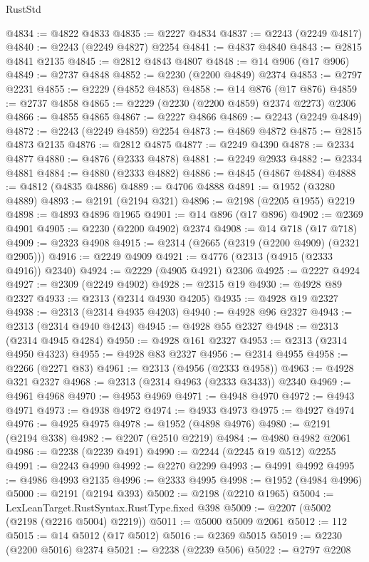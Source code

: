 \begin{lexlean}{RustStd}
\begin{coremodule}
{\begin{coremodule}
{{{{{{{{{{{{{{{{{{{{{{{{{{{{{{{{{{@4834 := @4822 @4833
@4835 := @2227 @4834
@4837 := @2243 (@2249 @4817)
@4840 := @2243 (@2249 @4827) @2254
@4841 := @4837 @4840
@4843 := @2815 @4841 @2135
@4845 := @2812 @4843 @4807
@4848 := @14 @906 (@17 @906)
@4849 := @2737 @4848
@4852 := @2230 (@2200 @4849) @2374
@4853 := @2797 @2231
@4855 := @2229 (@4852 @4853)
@4858 := @14 @876 (@17 @876)
@4859 := @2737 @4858
@4865 := @2229 (@2230 (@2200 @4859) @2374 @2273) @2306
@4866 := @4855 @4865
@4867 := @2227 @4866
@4869 := @2243 (@2249 @4849)
@4872 := @2243 (@2249 @4859) @2254
@4873 := @4869 @4872
@4875 := @2815 @4873 @2135
@4876 := @2812 @4875
@4877 := @2249 @4390
@4878 := @2334 @4877
@4880 := @4876 (@2333 @4878)
@4881 := @2249 @2933
@4882 := @2334 @4881
@4884 := @4880 (@2333 @4882)
@4886 := @4845 (@4867 @4884)
@4888 := @4812 (@4835 @4886)
@4889 := @4706 @4888
@4891 := @1952 (@3280 @4889)
@4893 := @2191 (@2194 @321)
@4896 := @2198 (@2205 @1955) @2219
@4898 := @4893 @4896 @1965
@4901 := @14 @896 (@17 @896)
@4902 := @2369 @4901
@4905 := @2230 (@2200 @4902) @2374
@4908 := @14 @718 (@17 @718)
@4909 := @2323 @4908
@4915 := @2314 (@2665 (@2319 (@2200 @4909) (@2321 @2905)))
@4916 := @2249 @4909
@4921 := @4776 (@2313 (@4915 (@2333 @4916)) @2340)
@4924 := @2229 (@4905 @4921) @2306
@4925 := @2227 @4924
@4927 := @2309 (@2249 @4902)
@4928 := @2315 @19
@4930 := @4928 @89 @2327
@4933 := @2313 (@2314 @4930 @4205)
@4935 := @4928 @19 @2327
@4938 := @2313 (@2314 @4935 @4203)
@4940 := @4928 @96 @2327
@4943 := @2313 (@2314 @4940 @4243)
@4945 := @4928 @55 @2327
@4948 := @2313 (@2314 @4945 @4284)
@4950 := @4928 @161 @2327
@4953 := @2313 (@2314 @4950 @4323)
@4955 := @4928 @83 @2327
@4956 := @2314 @4955
@4958 := @2266 (@2271 @83)
@4961 := @2313 (@4956 (@2333 @4958))
@4963 := @4928 @321 @2327
@4968 := @2313 (@2314 @4963 (@2333 @3433)) @2340
@4969 := @4961 @4968
@4970 := @4953 @4969
@4971 := @4948 @4970
@4972 := @4943 @4971
@4973 := @4938 @4972
@4974 := @4933 @4973
@4975 := @4927 @4974
@4976 := @4925 @4975
@4978 := @1952 (@4898 @4976)
@4980 := @2191 (@2194 @338)
@4982 := @2207 (@2510 @2219)
@4984 := @4980 @4982 @2061
@4986 := @2238 (@2239 @491)
@4990 := @2244 (@2245 @19 @512) @2255
@4991 := @2243 @4990
@4992 := @2270 @2299
@4993 := @4991 @4992
@4995 := @4986 @4993 @2135
@4996 := @2333 @4995
@4998 := @1952 (@4984 @4996)
@5000 := @2191 (@2194 @393)
@5002 := @2198 (@2210 @1965)
@5004 := LexLeanTarget.RustSyntax.RustType.fixed @398
@5009 := @2207 (@5002 (@2198 (@2216 @5004) @2219))
@5011 := @5000 @5009 @2061
@5012 := 112
@5015 := @14 @5012 (@17 @5012)
@5016 := @2369 @5015
@5019 := @2230 (@2200 @5016) @2374
@5021 := @2238 (@2239 @506)
@5022 := @2797 @2208
}}}}}}}}}}}}}}}}}}}}}}}}}}}}}}}}}}
\end{coremodule}}
\end{coremodule}
\end{lexlean}
